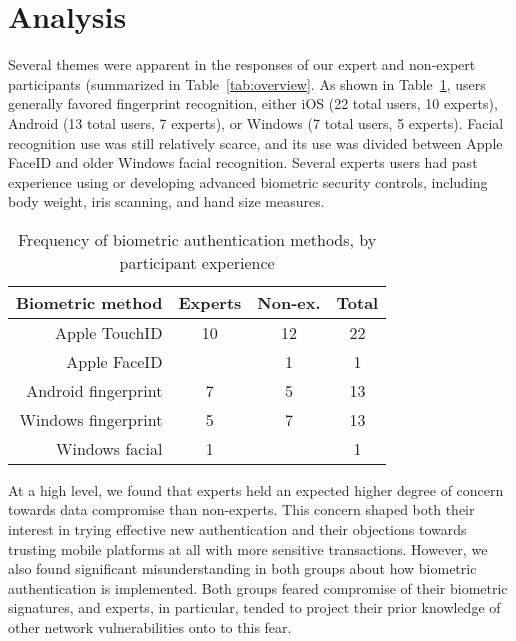 \section{Analysis}

Several themes were apparent in the
responses of our expert and non-expert participants (summarized in
Table~\ref{tab:overview}. As shown in Table~\ref{tab:BAM_freq}, users generally
favored fingerprint recognition, either iOS (22 total users, 10 experts),
Android (13 total users, 7 experts), or Windows (7 total users, 5
experts). Facial recognition use was still relatively scarce, and its use was
divided between Apple FaceID and older Windows facial recognition. Several
experts users had past experience using or developing advanced biometric
security controls, including body weight, iris scanning, and hand size measures.

\begin{table}[htbp]
\scriptsize
    \centering

    \begin{tabular}{r | c | c | c}
{\bf Biometric method} & {\bf Experts} & {\bf Non-ex.} &  {\bf Total} \\ \hline
 Apple TouchID & 10 & 12 & 22 \\
 Apple FaceID & & 1 & 1 \\ 
 Android fingerprint & 7 & 5 & 13 \\ 
 Windows fingerprint & 5 & 7 & 13 \\
 Windows facial & 1 & & 1 \\  
    \end{tabular}
    \caption{Frequency of biometric authentication methods, by participant experience}
\label{tab:BAM_freq}
\end{table}

% 

At a high level, we found that experts held an expected higher degree of concern
towards data compromise than non-experts. This concern shaped both their
interest in trying effective new authentication and their objections towards
trusting mobile platforms at all with more sensitive transactions. However, we
also found significant misunderstanding in both groups about how biometric
authentication is implemented. Both groups feared compromise of their biometric
signatures, and experts, in particular, tended to project their prior knowledge of
other network vulnerabilities onto to this fear.

